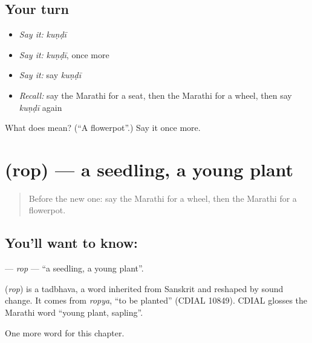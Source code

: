 \subsection*{Your turn}
\begin{itemize}
\raggedright
  \item \emph{Say it:} \emph{kuṇḍī}
  \item \emph{Say it:} \emph{kuṇḍī}, once more
  \item \emph{Say it:} say \emph{kuṇḍī}
  \item \emph{Recall:} say the Marathi for a seat, then the Marathi for a wheel, then say \emph{kuṇḍī} again
\end{itemize}

\begin{tcolorbox}[breakable,colback=teal!4,colframe=teal!35!black,title={Before you move on}]
What does  mean? (\textquotedblleft{}A flowerpot\textquotedblright{}.) Say it once more.
\end{tcolorbox}
\section[\texorpdfstring{\mr{रोप} (rop)}{रोप (rop)}]{ (rop) — a seedling, a young plant}

\label{lesson:MR-C241-rop}



\begin{quote}
Before the new one: say the Marathi for a wheel, then the Marathi for a flowerpot.
\end{quote}

\subsection*{You'll want to know: }
\textbf{} — \emph{rop} — \textquotedblleft{}a seedling, a young plant\textquotedblright{}.

\begin{cousinweb}
\textbf{} (\emph{rop}) is a tadbhava, a word inherited from Sanskrit and reshaped by sound change. It comes from \emph{ropya}, \textquotedblleft{}to be planted\textquotedblright{} (CDIAL 10849). CDIAL glosses the Marathi word \textquotedblleft{}young plant, sapling\textquotedblright{}.
\end{cousinweb}

\begin{grammarlens}[title={What you've built}]
One more word for this chapter.
\end{grammarlens}

